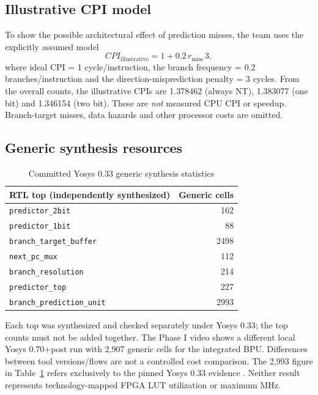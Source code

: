 \documentclass[conference,a4paper]{IEEEtran}
\begin{document}
\subsection{Illustrative CPI model}
To show the possible architectural effect of prediction misses, the team uses the explicitly assumed model
\begin{equation}
CPI_{\mathrm{illustrative}} = 1 + 0.2\,r_{\mathrm{miss}}\,3,
\end{equation}
where ideal CPI = 1 cycle/instruction, the branch frequency = 0.2 branches/instruction and the direction-misprediction penalty = 3 cycles. From the overall counts, the illustrative CPIs are 1.378462 (always NT), 1.383077 (one bit) and 1.346154 (two bit). These are \emph{not} measured CPU CPI or speedup. Branch-target misses, data hazards and other processor costs are omitted.

\subsection{Generic synthesis resources}
\begin{table}[t]
\caption{Committed Yosys 0.33 generic synthesis statistics}
\label{tab:synthesis}
\centering
\begin{tabular}{@{}lr@{}}
\toprule
RTL top (independently synthesized) & Generic cells \\
\midrule
\texttt{predictor\_2bit} & 162 \\
\texttt{predictor\_1bit} & 88 \\
\texttt{branch\_target\_buffer} & 2498 \\
\texttt{next\_pc\_mux} & 112 \\
\texttt{branch\_resolution} & 214 \\
\texttt{predictor\_top} & 227 \\
\texttt{branch\_prediction\_unit} & 2993 \\
\bottomrule
\end{tabular}
\end{table}

Each top was synthesized and checked separately under Yosys 0.33; the top counts must not be added together. The Phase I video shows a different local Yosys 0.70+post run with 2,907 generic cells for the integrated BPU. Differences between tool versions/flows are not a controlled cost comparison. The 2,993 figure in Table~\ref{tab:synthesis} refers exclusively to the pinned Yosys 0.33 evidence \cite{repo}. Neither result represents technology-mapped FPGA LUT utilization or maximum MHz.
\end{document}

